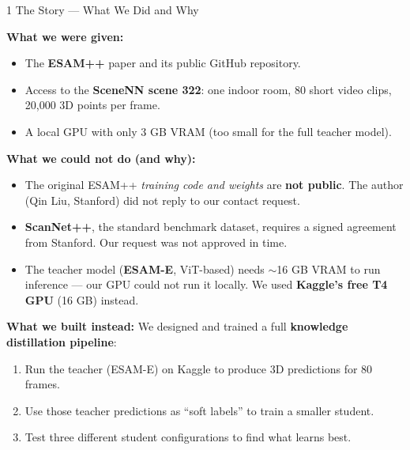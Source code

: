 \documentclass[12pt,a4paper]{article}
\newcommand{\bad}[1]{\textbf{\textcolor{alertred}{#1}}}
\begin{document}
\vspace{12pt}

\begin{sectionbox}[mainblue]{1 \quad The Story — What We Did and Why}

\textbf{What we were given:}
\begin{itemize}[noitemsep]
  \item The \textbf{ESAM++} paper and its public GitHub repository.
  \item Access to the \textbf{SceneNN scene 322}: one indoor room, 80 short video clips,
        20{,}000 3D points per frame.
  \item A local GPU with only 3 GB VRAM (too small for the full teacher model).
\end{itemize}

\medskip
\textbf{What we could not do (and why):}
\begin{itemize}[noitemsep]
  \item The original ESAM++ \textit{training code and weights} are \bad{not public}.
        The author (Qin Liu, Stanford) did not reply to our contact request.
  \item \textbf{ScanNet++}, the standard benchmark dataset, requires a signed agreement
        from Stanford. Our request was not approved in time.
  \item The teacher model (\textbf{ESAM-E}, ViT-based) needs $\sim$16 GB VRAM to run
        inference — our GPU could not run it locally.
        We used \textbf{Kaggle's free T4 GPU} (16 GB) instead.
\end{itemize}

\medskip
\textbf{What we built instead:}
We designed and trained a full \textbf{knowledge distillation pipeline}:
\begin{enumerate}[noitemsep]
  \item Run the teacher (ESAM-E) on Kaggle to produce 3D predictions for 80 frames.
  \item Use those teacher predictions as ``soft labels'' to train a smaller student.
  \item Test three different student configurations to find what learns best.
\end{enumerate}

\end{sectionbox}
\end{document}
